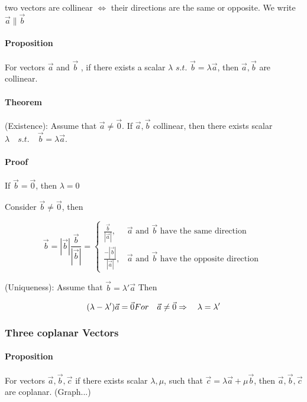 \documentclass[UTF8]{ctexart}
\begin{document}
two vectors are collinear $\iff$ their directions are the same or opposite. We write $\vec a \parallel \vec b $

\paragraph{Proposition} 

For vectors $\vec a $ and $ \vec  b$ , if there exists a scalar $\lambda$ $s.t.$  $\vec b = \lambda \vec a $, then $\vec a , \vec b $ are collinear.

\paragraph{Theorem}

(Existence): Assume that $\vec a \neq \vec 0$. If $\vec a, \vec b  $ collinear, then there exists scalar $\lambda \quad s.t. \quad  \vec b = \lambda \vec a $.

\paragraph{Proof}

If $\vec b = \vec 0 $, then $\lambda =0$

Consider $\vec b \neq \vec 0 $, then 

$$
\vec{b}=|\vec{b}| \frac{\vec{b}}{|\vec{b}|}=\left\{\begin{array}{ll}
\frac{\vec{b}}{|\vec{a}|}, & \vec{a} \text { and } \vec{b} \text { have the same direction } \\
\frac{-|\vec{b}|}{|\vec{a}|}, & \vec{a} \text { and } \vec{b} \text { have the opposite direction }
\end{array}\right.
$$


(Uniqueness): Assume that $\vec b = \lambda ' \vec a $ Then 

$$
(\lambda -\lambda ' )\vec a  = \vec 0 \\
  For \quad \vec a \neq \vec 0 \\
  \Rightarrow  \quad \lambda = \lambda '
$$

\subsubsection{Three coplanar Vectors}

\paragraph{Proposition}
For vectors $\vec a, \vec b ,\vec c $ if there exists scalar $\lambda , \mu $, such that $\vec c = \lambda \vec a +\mu \vec b $, then $\vec a, \vec b, \vec c$ are coplanar. (Graph...)
\end{document}
